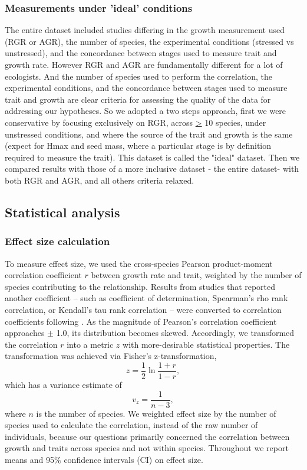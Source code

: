 \documentclass[a4paper,11pt]{article}
\begin{document}
\subsubsection*{Measurements under 'ideal' conditions}\label{ideal-vs-entire-dataset}

The entire dataset included studies differing in the growth measurement used (RGR or AGR), the number of species, the experimental conditions (stressed vs unstressed), and the concordance between stages used to measure trait and growth rate. However RGR and AGR are fundamentally different for a lot of ecologists. And the number of species used to perform the correlation, the experimental conditions, and the concordance between stages used to measure trait and growth are clear criteria for assessing the quality of the data for addressing our hypotheses. So we adopted a two steps approach, first we were conservative by focusing exclusively on RGR, across \underline{\textgreater} 10 species, under unstressed conditions, and where the source of the trait and growth is the same (expect for Hmax and seed mass, where a particular stage is by definition required to measure the trait). This dataset is called the "ideal" dataset. Then we compared results with those of a more inclusive dataset - the entire dataset- with both RGR and AGR, and all others criteria relaxed. 

\subsection*{Statistical analysis}\label{statistical-analyses}

\subsubsection*{Effect size calculation}\label{effect-size}

To measure effect size, we used the cross-species Pearson product-moment correlation coefficient $r$ between growth rate and trait, weighted by the number of species contributing to the relationship. Results from studies that reported another coefficient -- such as coefficient of determination, Spearman's rho rank correlation, or Kendall's tau rank correlation -- were converted to correlation coefficients following \citet{Lajeunesse:2013tm}. As the magnitude of Pearson's correlation coefficient approaches $\pm$ 1.0, its distribution becomes skewed. Accordingly, we transformed the correlation $r$ into a metric $z$ with more-desirable statistical properties. The transformation was achieved via Fisher's z-transformation,
\[ z = \frac{1}{2} \ln \frac{1+r}{1-r},\]
which has a variance estimate of
\[ v_z= \frac{1}{n-3},\]
where $n$ is the number of species. We weighted effect size by the number of species used to calculate the correlation, instead of the raw number of individuals, because our questions primarily concerned the correlation between growth and traits across species and not within species. Throughout we report means and 95\% confidence intervals (CI) on effect size.
\end{document}
